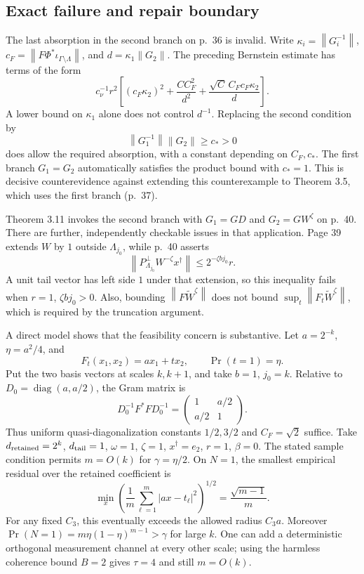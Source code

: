 \documentclass[10pt]{article}
\begin{document}
\subsection*{Exact failure and repair boundary}
The last absorption in the second branch on p. 36 is invalid. Write \(\kappa_i=\left\lVert G_i^{-1}\right\rVert\), \(c_F=\left\lVert F\Phi^*\iota_{\Gamma\setminus\Lambda}\right\rVert\), and \(d=\kappa_1\left\lVert G_2\right\rVert\). The preceding Bernstein estimate has terms of the form \[c_\nu^{-1}r^2\left[
(c_F\kappa_2)^2+\frac{CC_F^2}{d^2}
+\frac{\sqrt C\,C_Fc_F\kappa_2}{d}\right].\] A lower bound on \(\kappa_1\) alone does not control \(d^{-1}\). Replacing the second condition by \[\left\lVert G_1^{-1}\right\rVert\left\lVert G_2\right\rVert\ge c_*>0\] does allow the required absorption, with a constant depending on \(C_F,c_*\). The first branch \(G_1=G_2\) automatically satisfies the product bound with \(c_*=1\). This is decisive counterevidence against extending this counterexample to Theorem 3.5, which uses the first branch (p. 37).\par
Theorem 3.11 invokes the second branch with \(G_1=GD\) and \(G_2=GW^\zeta\) on p. 40. There are further, independently checkable issues in that application. Page 39 extends \(W\) by \(1\) outside \(\Lambda_{j_0}\), while p. 40 asserts \[\left\lVert P_{\Lambda_{j_0}}^\perp W^{-\zeta}x^\dagger\right\rVert
 \le 2^{-\zeta bj_0}r.\] A unit tail vector has left side \(1\) under that extension, so this inequality fails when \(r=1\), \(\zeta bj_0>0\). Also, bounding \(\left\lVert F\widetilde W^\zeta\right\rVert\) does not bound \(\sup_t\left\lVert F_t\widetilde W^\zeta\right\rVert\), which is required by the truncation argument.\par
A direct model shows that the feasibility concern is substantive. Let \(a=2^{-k}\), \(\eta=a^2/4\), and \[F_t(x_1,x_2)=a x_1+t x_2,\qquad \Pr(t=1)=\eta.\] Put the two basis vectors at scales \(k,k+1\), and take \(b=1\), \(j_0=k\). Relative to \(D_0=\operatorname{diag}(a,a/2)\), the Gram matrix is \[D_0^{-1}F^*FD_0^{-1}
=\begin{pmatrix}1&a/2\\a/2&1\end{pmatrix}.\] Thus uniform quasi-diagonalization constants \(1/2,3/2\) and \(C_F=\sqrt2\) suffice. Take \(d_{\rm retained}=2^k\), \(d_{\rm tail}=1\), \(\omega=1\), \(\zeta=1\), \(x^\dagger=e_2\), \(r=1\), \(\beta=0\). The stated sample condition permits \(m=O(k)\) for \(\gamma=\eta/2\). On \(N=1\), the smallest empirical residual over the retained coefficient is \[\min_x\left(\frac1m\sum_{\ell=1}^m|ax-t_\ell|^2\right)^{1/2}
 =\frac{\sqrt{m-1}}m.\] For any fixed \(C_3\), this eventually exceeds the allowed radius \(C_3a\). Moreover \(\Pr(N=1)=m\eta(1-\eta)^{m-1}>\gamma\) for large \(k\). One can add a deterministic orthogonal measurement channel at every other scale; using the harmless coherence bound \(B=2\) gives \(\tau=4\) and still \(m=O(k)\).\par
\end{document}
